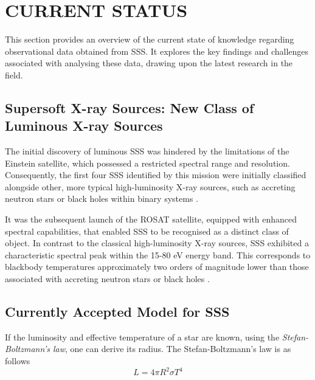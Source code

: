     \section{\MakeUppercase{Current Status}} \label{introduction:current_status}
		This section provides an overview of the current state of knowledge regarding observational data obtained from SSS.  It explores the key findings and challenges associated with analysing these data, drawing upon the latest research in the field.
        
        \subsection{Supersoft X-ray Sources: New Class of Luminous X-ray Sources} \label{introduction:current_status:new-class}
        	The initial discovery of luminous SSS was hindered by the limitations of the Einstein satellite, which possessed a restricted spectral range and resolution. Consequently, the first four SSS identified by this mission were initially classified alongside other, more typical high-luminosity X-ray sources, such as accreting neutron stars or black holes within binary systems \cite{long81,seward81}.
        	
        	It was the subsequent launch of the ROSAT satellite, equipped with enhanced spectral capabilities, that enabled SSS to be recognised as a distinct class of object. In contrast to the classical high-luminosity X-ray sources, SSS exhibited a characteristic spectral peak within the 15-80 eV energy band. This corresponds to blackbody temperatures approximately two orders of magnitude lower than those associated with accreting neutron stars or black holes \cite{kahabka97}.
        	
        \subsection{Currently Accepted Model for SSS} \label{introduction:current_status:SSS-model}
        	If the luminosity and effective temperature of a star are known, using the \emph{Stefan-Boltzmann's law}, one can derive its radius. The Stefan-Boltzmann's law is as follows
        	\begin{equation} \label{SSS-model:stef-boltz}
        		L=4\pi R^2\sigma T^4
        	\end{equation}
        	
